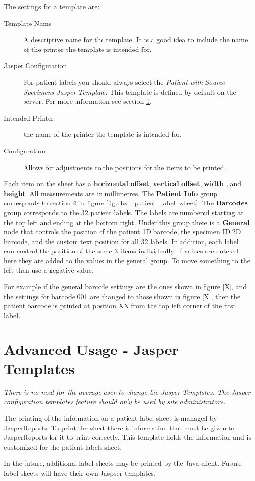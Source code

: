 The settings for a template are:
\begin{description}
\item[Template Name] A descriptive name for the template. It is a good idea to
  include the name of the printer the template is intended for.
\item[Jasper Configuration] For patient labels you should always select the
\emph{Patient with Source Specimens Jasper Template}. This template is defined
by default on the server. For more information see section \ref{sec:jasper_templates}.
\item[Intended Printer] the name of the printer the template is intended for.
\item[Configuration] Allows for adjustments to the positions for the items to be printed.
\end{description}

Each item on the sheet has a \textbf{horizontal offset},
\textbf{vertical offset}, \textbf{width }, and \textbf{height}. All
measurements are in millimetres. The \textbf{Patient Info} group corresponds to
section \textbf{3} in figure \ref{fig:cbsr_patient_label_sheet}. The
\textbf{Barcodes} group corresponds to the 32 patient labels. The labels are
numbered starting at the top left and ending at the bottom right. Under this
group there is a \textbf{General} node that controls the position of the
patient 1D barcode, the specimen ID 2D barcode, and the custom text position
for all 32 labels. In addition, each label can control the position of the same
3 items individually. If values are entered here they are added to the values
in the general group. To move something to the left then use a negative value.

For example if the general barcode settings are the ones shown in figure
\ref{X}, and the settings for barcode 001 are changed to those shown in figure
\ref{X}, then the patient barcode is printed at position XX from the top left
corner of the first label.


\section{Advanced Usage - Jasper Templates}
\label{sec:jasper_templates}

\emph{There is no need for the average user to change the Jasper
  Templates. The Jasper configuration templates feature should only be used by
site administrators.}

The printing of the information on a patient label sheet is managed by
JasperReports. To print the sheet there is information that must be given to
JasperReports for it to print correctly. This template holds the information and
is customized for the patient labels sheet.

In the future, additional label sheets may be printed by the Java client. Future
label sheets will have their own Jaspser templates.


